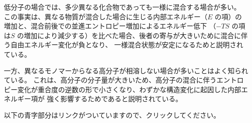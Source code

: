 \documentclass[uplatex,dvipdfmx,a4paper,11pt, titlepage]{jsarticle}
\begin{document}
\begin{itemize}
\begin{enumerate}
	低分子の場合では、多少異なる化合物であっても一様に混合する場合が多い。
	この事実は、異なる物質が混合した場合に生じる内部エネルギー（$E$ の項）の増加と、混合前後での並進エントロピー増加によるエネルギー低下
	（$-TS$ の項は$S$ の増加により減少する）を比べた場合、後者の寄与が大きいために混合に伴う自由エネルギー変化が負となり、
	一様混合状態が安定になるためと説明されている。

	一方、異なるモノマーからなる高分子が相溶しない場合が多いことはよく知られている。
	これは、高分子の分子量が大きいため、高分子の混合に伴うエントロピー変化が重合度の逆数の形で小さくなり、わずかな構造変化に起因した内部エネルギー項が
	強く影響するためであると説明されている。


	\end{enumerate}

\end{itemize}



\newpage
\begin{center}
{\Large {}}
\end{center}

以下の青字部分はリンクがついていますので、クリックしてください。
\end{document}
